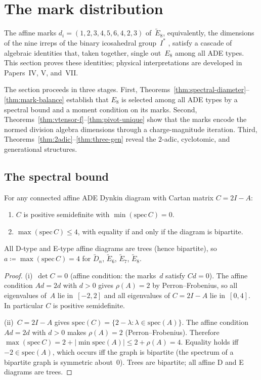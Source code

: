 \section{The mark distribution}
\label{sec:mark-distribution}

The affine marks $d_i = (1,2,3,4,5,6,4,2,3)$ of~$\tilde{E}_8$, equivalently,
the dimensions of the nine irreps of the binary icosahedral group~$I^*$
\citep{McKay1980}, satisfy a cascade of algebraic identities that,
taken together, single out~$E_8$ among all ADE types.
This section proves these identities; physical interpretations are
developed in Papers~IV, V, and~VII.

The section proceeds in three stages.
First, Theorems~\ref{thm:spectral-diameter}--\ref{thm:mark-balance}
establish that $E_8$ is selected among all ADE types by a spectral
bound and a moment condition on its marks.
Second, Theorems~\ref{thm:vtensor-f}--\ref{thm:pivot-unique} show
that the marks encode the normed division algebra dimensions through
a charge-magnitude iteration.
Third, Theorems~\ref{thm:2adic}--\ref{thm:three-gen} reveal the
$2$-adic, cyclotomic, and generational structures.

\subsection{The spectral bound}
\label{sec:spectral-diameter}

\begin{theorem}\label{thm:spectral-diameter}
For any connected affine ADE Dynkin diagram with Cartan matrix $C = 2I - A$:
\begin{enumerate}
\item[(i)] $C$ is positive semidefinite with $\min(\mathrm{spec}\,C) = 0$.
\item[(ii)] $\max(\mathrm{spec}\,C) \le 4$, with equality if and only if
  the diagram is bipartite.
\end{enumerate}
All D-type and E-type affine diagrams are trees (hence bipartite),
so $a \coloneqq \max(\mathrm{spec}\,C) = 4$ for $\tilde{D}_n$,
$\tilde{E}_6$, $\tilde{E}_7$, $\tilde{E}_8$.
\end{theorem}

\begin{proof}
(i)~$\det C = 0$ (affine condition: the marks~$d$ satisfy $Cd = 0$).
The affine condition $Ad = 2d$ with $d > 0$ gives $\rho(A) = 2$
by Perron--Frobenius, so all eigenvalues of~$A$ lie in~$[-2,2]$
and all eigenvalues of $C = 2I - A$ lie in~$[0,4]$.
In particular $C$ is positive semidefinite.

(ii)~$C = 2I - A$ gives $\mathrm{spec}(C) = \{2 - \lambda : \lambda \in \mathrm{spec}(A)\}$.
The affine condition $Ad = 2d$ with $d > 0$ makes $\rho(A) = 2$ (Perron--Frobenius).
Therefore $\max(\mathrm{spec}\,C) = 2 + |\min\mathrm{spec}(A)| \le 2 + \rho(A) = 4$.
Equality holds iff $-2 \in \mathrm{spec}(A)$, which occurs iff the graph
is bipartite (the spectrum of a bipartite graph is symmetric about~$0$).
Trees are bipartite; all affine D and E diagrams are trees.
\end{proof}

